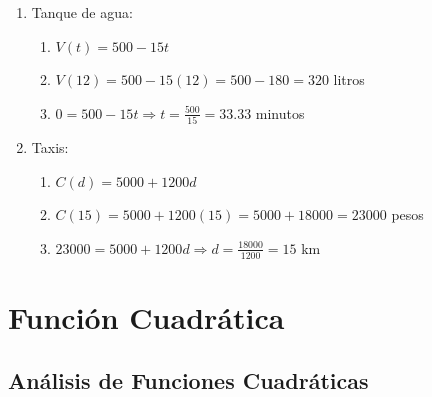 \documentclass[12pt,a4paper]{article}
\begin{document}
\begin{enumerate}
    \item Tanque de agua:
    \begin{enumerate}
        \item $V(t) = 500 - 15t$
        \item $V(12) = 500 - 15(12) = 500 - 180 = 320$ litros
        \item $0 = 500 - 15t \Rightarrow t = \frac{500}{15} = 33.33$ minutos
    \end{enumerate}
    
    \item Taxis:
    \begin{enumerate}
        \item $C(d) = 5000 + 1200d$
        \item $C(15) = 5000 + 1200(15) = 5000 + 18000 = 23000$ pesos
        \item $23000 = 5000 + 1200d \Rightarrow d = \frac{18000}{1200} = 15$ km
    \end{enumerate}
\end{enumerate}

\section{Función Cuadrática}

\subsection{Análisis de Funciones Cuadráticas}
\end{document}
